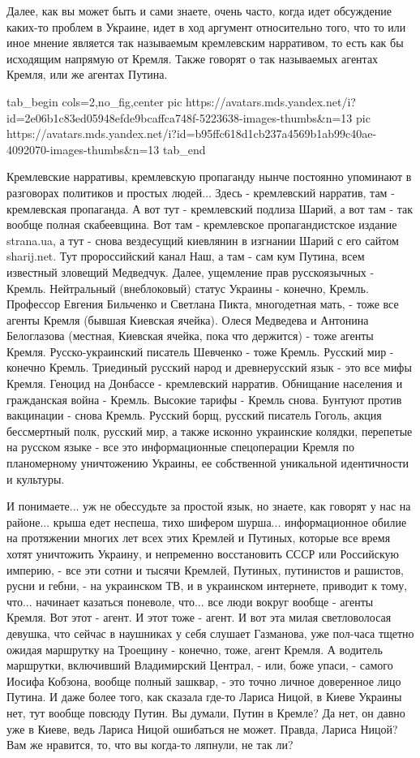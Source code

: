 Далее, как вы может быть и сами знаете, очень часто, когда идет обсуждение
каких-то проблем в Украине, идет в ход аргумент относительно того, что то или
иное мнение является так называемым кремлевским нарративом, то есть как бы
исходящим напрямую от Кремля. Также говорят о так называемых агентах Кремля,
или же агентах Путина.

\ifcmt
  tab_begin cols=2,no_fig,center
     pic https://avatars.mds.yandex.net/i?id=2e06b1c83ed05948efde9bcaffca748f-5223638-images-thumbs&n=13
		 pic https://avatars.mds.yandex.net/i?id=b95ffc618d1cb237a4569b1ab99c40ae-4092070-images-thumbs&n=13
  tab_end
\fi

Кремлевские нарративы, кремлевскую пропаганду нынче постоянно упоминают в
разговорах политиков и простых людей... Здесь - кремлевский нарратив, там -
кремлевская пропаганда.  А вот тут - кремлевский подлиза Шарий, а вот там - так
вообще полная скабеевщина. Вот там - кремлевское пропагандистское издание
strana.ua, а тут - снова вездесущий киевлянин в изгнании Шарий с его сайтом
sharij.net. Тут пророссийский канал Наш, а там - сам кум Путина, всем известный
зловещий Медведчук. Далее, ущемление прав русскоязычных - Кремль. Нейтральный
(внеблоковый) статус Украины - конечно, Кремль. Профессор Евгения Бильченко и
Светлана Пикта, многодетная мать, - тоже все агенты Кремля (бывшая Киевская
ячейка). Олеся Медведева и Антонина Белоглазова (местная, Киевская ячейка, пока
что держится) - тоже агенты Кремля. Русско-украинский писатель Шевченко - тоже
Кремль. Русский мир - конечно Кремль. Триединый русский народ и древнерусский
язык - это все мифы Кремля. Геноцид на Донбассе - кремлевский нарратив.
Обнищание населения и гражданская война - Кремль. Высокие тарифы - Кремль
снова. Бунтуют против вакцинации - снова Кремль. Русский борщ, русский писатель
Гоголь, акция бессмертный полк, русский мир, а также исконно украинские
колядки, перепетые на русском языке - все это информационные спецоперации
Кремля по планомерному уничтожению Украины, ее собственной уникальной
идентичности и культуры.

И понимаете... уж не обессудьте за простой язык, но знаете, как говорят у нас
на районе...  крыша едет неспеша, тихо шифером шурша... информационное обилие
на протяжении многих лет всех этих Кремлей и Путиных, которые все время хотят
уничтожить Украину, и непременно восстановить СССР или Российскую империю, -
все эти сотни и тысячи Кремлей, Путиных, путинистов и рашистов, русни и гебни,
- на украинском ТВ, и в украинском интернете, приводит к тому, что... начинает
казаться поневоле, что... все люди вокруг вообще - агенты Кремля. Вот этот -
агент. И этот тоже - агент. И вот эта милая светловолосая девушка, что сейчас в
наушниках у себя слушает Газманова, уже пол-часа тщетно ожидая маршрутку на
Троещину - конечно, тоже, агент Кремля. А водитель маршрутки, включивший
Владимирский Централ, - или, боже упаси, - самого Иосифа Кобзона, вообще полный
зашквар, - это точно личное доверенное лицо Путина. И даже более того, как
сказала где-то Лариса Ницой, в Киеве Украины нет, тут вообще повсюду Путин. Вы
думали, Путин в Кремле? Да нет, он давно уже в Киеве, ведь Лариса Ницой
ошибаться не может.  Правда, Лариса Ницой? Вам же нравится, то, что вы когда-то
ляпнули, не так ли?


